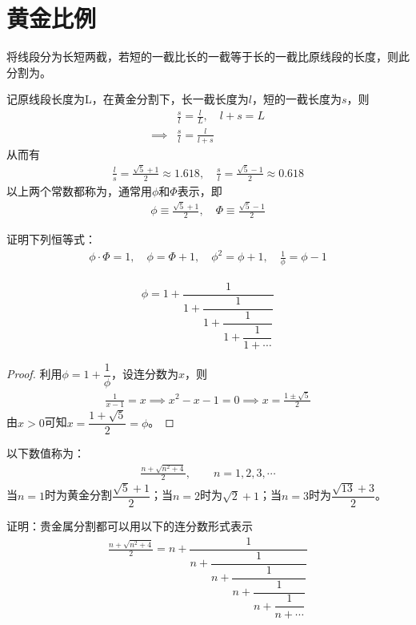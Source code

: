 
\chapter{黄金比例}
\label{ch:golden-ratio}

\begin{definition}
  将线段分为长短两截，若短的一截比长的一截等于长的一截比原线段的长度，则此分割为。
\end{definition}

记原线段长度为L，在黄金分割下，长一截长度为$l$，短的一截长度为$s$，则
\begin{align*}
  &\frac sl=\frac lL,\quad l+s=L\\
  \implies& \frac sl=\frac l{l+s}
\end{align*}
从而有
\begin{align*}
  \frac ls=\frac{\sqrt5+1}2\approx 1.618, \quad \frac sl=\frac{\sqrt5-1}2\approx 0.618
\end{align*}
以上两个常数都称为，通常用$\phi$和$\Phi$表示，即
\begin{align*}
  \phi\equiv\frac{\sqrt5+1}2,\quad \Phi\equiv\frac{\sqrt5-1}2
\end{align*}

\begin{question}
  证明下列恒等式：
  \begin{align*}
    \phi\cdot\Phi=1,\quad \phi=\Phi+1,\quad \phi^2=\phi+1,\quad \frac1\phi=\phi-1
  \end{align*}
\end{question}

\begin{example}[连分数表示]\label{ex:phi-of-continued-fraction}
  \begin{align}
    \phi = 1 + \dfrac1{1 + \dfrac1{1+\dfrac1{1+\dfrac1{1+\cdots}}}}
  \end{align}
\end{example}
\begin{proof}
  利用$\phi=1+\dfrac1\phi$，设连分数为$x$，则
  \begin{align*}
    \frac1{x-1}=x\implies x^2-x-1=0\implies x=\frac{1\pm\sqrt5}2
  \end{align*}
  由$x>0$可知$x=\dfrac{1+\sqrt5}2=\phi$。
\end{proof}

\begin{definition}
  以下数值称为：
  \begin{align}
    \frac{n+\sqrt{n^2+4}}2,\quad\quad n=1,2,3,\cdots
  \end{align}
  当$n=1$时为黄金分割$\dfrac{\sqrt5+1}2$；当$n=2$时为$\sqrt2+1$；当$n=3$时为$\dfrac{\sqrt{13}+3}2$。
\end{definition}
\begin{question}
  证明：贵金属分割都可以用以下的连分数形式表示
  \begin{align*}
    \frac{n+\sqrt{n^2+4}}2=
    n+\dfrac1{n+\dfrac1{n+\dfrac1{n+\dfrac1{n+\dfrac1{n+\cdots}}}}}
  \end{align*}
\end{question}

